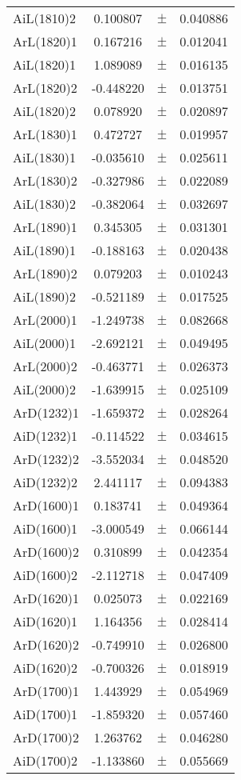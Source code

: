 \begin{table}
\begin{tiny}
\begin{tabular}{lccc}
AiL(1810)2 & 0.100807 & $\pm$ & 0.040886 \\
ArL(1820)1 & 0.167216 & $\pm$ & 0.012041 \\
AiL(1820)1 & 1.089089 & $\pm$ & 0.016135 \\
ArL(1820)2 & -0.448220 & $\pm$ & 0.013751 \\
AiL(1820)2 & 0.078920 & $\pm$ & 0.020897 \\
ArL(1830)1 & 0.472727 & $\pm$ & 0.019957 \\
AiL(1830)1 & -0.035610 & $\pm$ & 0.025611 \\
ArL(1830)2 & -0.327986 & $\pm$ & 0.022089 \\
AiL(1830)2 & -0.382064 & $\pm$ & 0.032697 \\
ArL(1890)1 & 0.345305 & $\pm$ & 0.031301 \\
AiL(1890)1 & -0.188163 & $\pm$ & 0.020438 \\
ArL(1890)2 & 0.079203 & $\pm$ & 0.010243 \\
AiL(1890)2 & -0.521189 & $\pm$ & 0.017525 \\
ArL(2000)1 & -1.249738 & $\pm$ & 0.082668 \\
AiL(2000)1 & -2.692121 & $\pm$ & 0.049495 \\
ArL(2000)2 & -0.463771 & $\pm$ & 0.026373 \\
AiL(2000)2 & -1.639915 & $\pm$ & 0.025109 \\
ArD(1232)1 & -1.659372 & $\pm$ & 0.028264 \\
AiD(1232)1 & -0.114522 & $\pm$ & 0.034615 \\
ArD(1232)2 & -3.552034 & $\pm$ & 0.048520 \\
AiD(1232)2 & 2.441117 & $\pm$ & 0.094383 \\
ArD(1600)1 & 0.183741 & $\pm$ & 0.049364 \\
AiD(1600)1 & -3.000549 & $\pm$ & 0.066144 \\
ArD(1600)2 & 0.310899 & $\pm$ & 0.042354 \\
AiD(1600)2 & -2.112718 & $\pm$ & 0.047409 \\
ArD(1620)1 & 0.025073 & $\pm$ & 0.022169 \\
AiD(1620)1 & 1.164356 & $\pm$ & 0.028414 \\
ArD(1620)2 & -0.749910 & $\pm$ & 0.026800 \\
AiD(1620)2 & -0.700326 & $\pm$ & 0.018919 \\
ArD(1700)1 & 1.443929 & $\pm$ & 0.054969 \\
AiD(1700)1 & -1.859320 & $\pm$ & 0.057460 \\
ArD(1700)2 & 1.263762 & $\pm$ & 0.046280 \\
AiD(1700)2 & -1.133860 & $\pm$ & 0.055669 \\
\bottomrule
\end{tabular}
\end{tiny}
\end{table}

